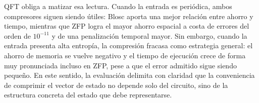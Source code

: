 QFT obliga a matizar esa lectura. Cuando la entrada es periódica, ambos compresores siguen
siendo útiles: Blosc aporta una mejor relación entre ahorro y tiempo, mientras que ZFP logra
el mayor ahorro espacial a costa de errores del orden de $10^{-11}$ y de una penalización
temporal mayor. Sin embargo, cuando la entrada presenta alta entropía, la compresión fracasa
como estrategia general: el ahorro de memoria se vuelve negativo y el tiempo de ejecución crece
de forma muy pronunciada incluso en ZFP, pese a que el error admitido sigue siendo pequeño. En
este sentido, la evaluación delimita con claridad que la conveniencia de comprimir el vector de
estado no depende solo del circuito, sino de la estructura concreta del estado que debe
representarse.
